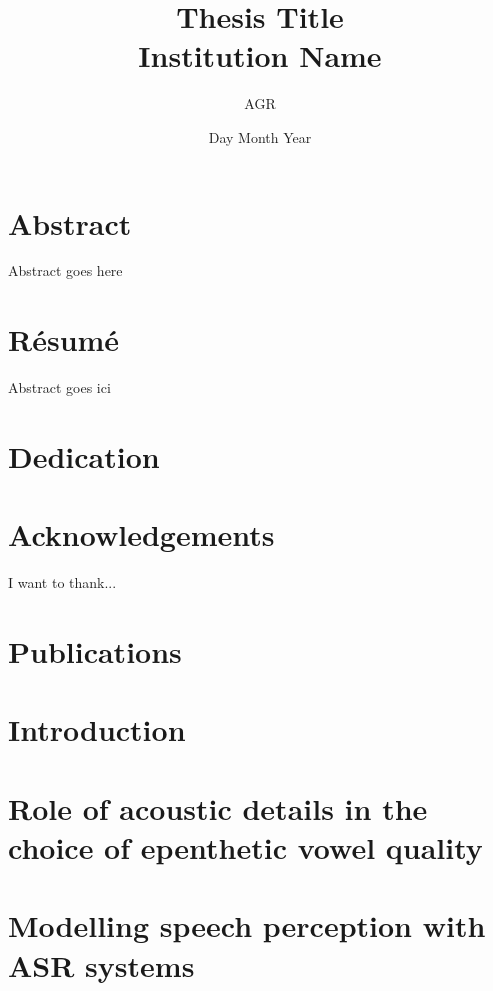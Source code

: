 \documentclass[12pt, twoside]{report}
\title{
	{Thesis Title}\\
	{\large Institution Name}\\
}
\author{AGR}
\date{Day Month Year}
\begin{document}
\maketitle

\chapter*{Abstract}
Abstract goes here

\chapter*{Résumé}
Abstract goes ici

\chapter*{Dedication}


\chapter*{Acknowledgements}
I want to thank...

\chapter*{Publications}


\tableofcontents
\linenumbers
\chapter{Introduction}
\setcounter{page}{1}


\chapter{Role of acoustic details in the choice of epenthetic vowel quality}


\chapter{Modelling speech perception with ASR systems}


%
\end{document}
